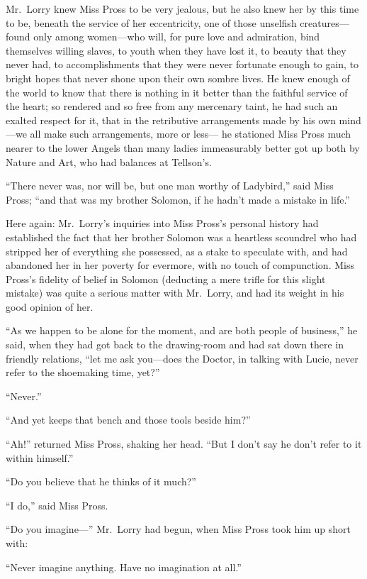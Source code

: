 Mr.\ Lorry knew Miss Pross to be very jealous, but he also knew her by
this time to be, beneath the service of her eccentricity, one of those
unselfish creatures---found only among women---who will, for pure love
and admiration, bind themselves willing slaves, to youth when they
have lost it, to beauty that they never had, to accomplishments that
they were never fortunate enough to gain, to bright hopes that never
shone upon their own sombre lives.  He knew enough of the world to
know that there is nothing in it better than the faithful service of
the heart; so rendered and so free from any mercenary taint, he had
such an exalted respect for it, that in the retributive arrangements
made by his own mind---we all make such arrangements, more or less---%
he stationed Miss Pross much nearer to the lower Angels than many
ladies immeasurably better got up both by Nature and Art, who had
balances at Tellson's.

``There never was, nor will be, but one man worthy of Ladybird,'' said
Miss Pross; ``and that was my brother Solomon, if he hadn't made a
mistake in life.''

Here again:  Mr.\ Lorry's inquiries into Miss Pross's personal history
had established the fact that her brother Solomon was a heartless
scoundrel who had stripped her of everything she possessed, as a
stake to speculate with, and had abandoned her in her poverty for
evermore, with no touch of compunction.  Miss Pross's fidelity of
belief in Solomon (deducting a mere trifle for this slight mistake)
was quite a serious matter with Mr.\ Lorry, and had its weight in his
good opinion of her.

``As we happen to be alone for the moment, and are both people of
business,'' he said, when they had got back to the drawing-room and
had sat down there in friendly relations, ``let me ask you---does the
Doctor, in talking with Lucie, never refer to the shoemaking time, yet?''

``Never.''

``And yet keeps that bench and those tools beside him?''

``Ah!'' returned Miss Pross, shaking her head.  ``But I don't say he
don't refer to it within himself.''

``Do you believe that he thinks of it much?''

``I do,'' said Miss Pross.

``Do you imagine---'' Mr.\ Lorry had begun, when Miss Pross took him up
short with:

``Never imagine anything.  Have no imagination at all.''

